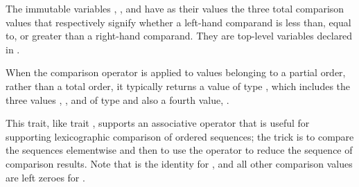 The immutable variables , , and 
have as their values the three total comparison values
that respectively signify whether a left-hand comparand is less than,
equal to, or greater than a right-hand comparand.
They are top-level variables declared in \library.




When the comparison operator  is applied to values belonging
to a partial order, rather than a total order, it typically returns a value
of type , which includes the three values
, , and  of type
 and also a fourth value, .

This trait, like trait , supports an associative operator  that
is useful for supporting lexicographic comparison of ordered sequences;
the trick is to compare the sequences elementwise and then to use the
 operator to reduce the sequence of comparison results.
Note that  is the identity for ,
and all other comparison values are left zeroes for .



